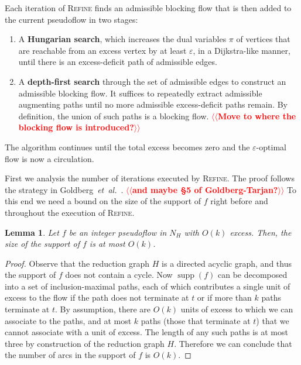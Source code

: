 \documentclass[11pt]{article}
\makeatletter
\def\etal{\textit{et~al.}}
\def\eps{\varepsilon}
\def\supp{\operatorname{supp}}
\theoremstyle{plain}
\newtheorem{lemma}{Lemma}[section]
\numberwithin{figure}{section}
\def\EMPH#1{\textbf{\boldmath #1}}
\def\n@te#1{\textsf{\boldmath \textbf{$\langle\!\langle$#1$\rangle\!\rangle$}}\leavevmode}
\def\note#1{\textcolor{red}{\n@te{#1}}}
\makeatother
\begin{document}
Each iteration of \textsc{Refine} finds an admissible blocking flow that is then added to the current pseudoflow in two stages:
\begin{enumerate}
\item
A \EMPH{Hungarian search}, which increases the dual variables $\pi$ of vertices that are reachable from an excess vertex by at least $\eps$, in a Dijkstra-like manner, until there is an excess-deficit path of admissible edges.
\item
A \EMPH{depth-first search} through the set of admissible edges to construct an admissible blocking flow.
It suffices to repeatedly extract admissible augmenting paths until no more admissible excess-deficit paths remain.
By definition, the union of such paths is a blocking flow. \note{Move to where the blocking flow is introduced?}
\end{enumerate}
The algorithm continues until the total excess becomes zero and the $\eps$-optimal flow is now a circulation.

First we analysis the number of iterations executed by \textsc{Refine}.
The proof follows the strategy in Goldberg~\etal~\cite[Section~3.2]{GHKT17}. \note{and maybe \S5 of Goldberg-Tarjan?}
%
%
To this end we need a bound on the size of the support of $f$ right before and throughout the execution of \textsc{Refine}.


\begin{lemma}
\label{lemma:reduction_count}
Let $f$ be an integer pseudoflow in $N_H$ with $O(k)$ excess.
Then, the size of the support of $f$ is at most $O(k)$.
\end{lemma}

\begin{proof}
Observe that the reduction graph $H$ is a directed acyclic graph, and thus the support of $f$ does not contain a cycle.
Now $\supp(f)$ can be decomposed into a set of inclusion-maximal paths,
each of which contributes a single unit of excess to the flow if the path does not terminate at $t$ or if more than $k$ paths terminate at $t$.
By assumption, there are $O(k)$ units of excess to which we can associate to the paths, and at most $k$ paths (those that terminate at $t$) that we cannot associate with a unit of excess.
The length of any such paths is at most  three by construction of the reduction graph $H$.
Therefore we can conclude that the number of arcs in the support of $f$ is $O(k)$.
\end{proof}
\end{document}
